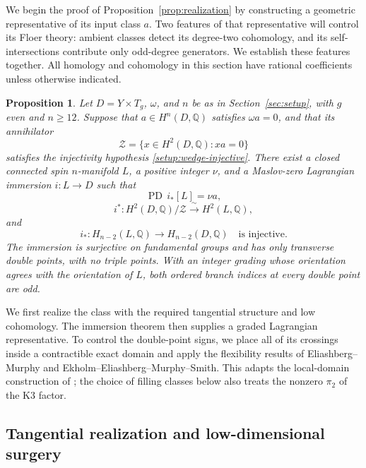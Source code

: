 \documentclass[11pt]{article}
\numberwithin{equation}{section}
\newtheorem{proposition}[theorem]{Proposition}
\theoremstyle{definition}
\theoremstyle{remark}
\newcommand{\Q}{\mathbb Q}
\DeclareMathOperator{\PD}{PD}
\begin{document}
We begin the proof of Proposition~\ref{prop:realization} by constructing
a geometric representative of its input class $a$.  Two features of that representative will control its
Floer theory: ambient classes detect its degree-two cohomology, and its
self-intersections contribute only odd-degree generators.  We establish
these features together.  All homology and cohomology in this section have
rational coefficients unless otherwise indicated.

\begin{proposition}\label{prop:immersion}
Let $D=Y\times T_g$, $\omega$, and $n$ be as in Section~\ref{sec:setup}, with
$g$ even and $n\geq12$.  Suppose that $a\in H^n(D,\Q)$ satisfies
$\omega a=0$, and that its annihilator
\[
 \mathcal Z=\{x\in H^2(D,\Q):xa=0\}
\]
satisfies the injectivity hypothesis \eqref{setup:wedge-injective}.
There exist a closed connected spin $n$-manifold $L$, a positive integer
$\nu$, and a Maslov-zero Lagrangian immersion $i:L\to D$ such that
\begin{equation}\label{topo:class}
 \PD\,i_*[L]=\nu a,
\end{equation}
\begin{equation}\label{topo:h2}
 i^*:H^2(D,\Q)/\mathcal Z\xrightarrow{\ \sim\ }H^2(L,\Q),
\end{equation}
and
\begin{equation}\label{topo:push}
 i_*:H_{n-2}(L,\Q)\longrightarrow H_{n-2}(D,\Q)
 \quad\text{is injective}.
\end{equation}
The immersion is surjective on fundamental groups and has only transverse
double points, with no triple points.  With an integer grading whose
orientation agrees with the orientation of $L$, both ordered branch
indices at every double point are odd.
\end{proposition}

We first realize the class with the required tangential structure and low
cohomology.  The immersion theorem then supplies a graded Lagrangian
representative.  To control the double-point signs, we place all of its
crossings inside a contractible exact domain and apply the flexibility
results of Eliashberg--Murphy and Ekholm--Eliashberg--Murphy--Smith.  This
adapts the local-domain construction of \cite[Section~3]{A8}; the choice
of filling classes below also treats the nonzero $\pi_2$ of the K3 factor.

\subsection{Tangential realization and low-dimensional surgery}
\end{document}
